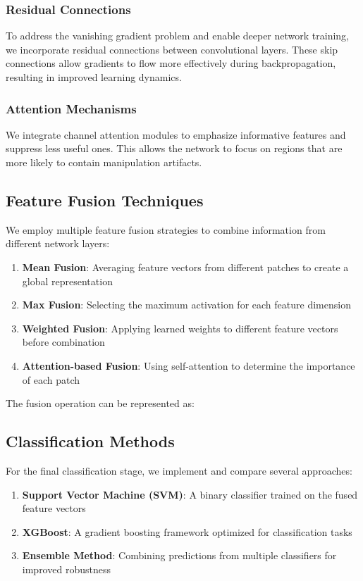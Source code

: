 \documentclass[conference]{IEEEtran}
\begin{document}
\subsubsection{Residual Connections}
To address the vanishing gradient problem and enable deeper network training, we incorporate residual connections between convolutional layers. These skip connections allow gradients to flow more effectively during backpropagation, resulting in improved learning dynamics.


\subsubsection{Attention Mechanisms}
We integrate channel attention modules to emphasize informative features and suppress less useful ones. This allows the network to focus on regions that are more likely to contain manipulation artifacts.



\subsection{Feature Fusion Techniques}
We employ multiple feature fusion strategies to combine information from different network layers:

\begin{enumerate}
    \item \textbf{Mean Fusion}: Averaging feature vectors from different patches to create a global representation
    \item \textbf{Max Fusion}: Selecting the maximum activation for each feature dimension
    \item \textbf{Weighted Fusion}: Applying learned weights to different feature vectors before combination
    \item \textbf{Attention-based Fusion}: Using self-attention to determine the importance of each patch
\end{enumerate}

The fusion operation can be represented as:



\subsection{Classification Methods}
For the final classification stage, we implement and compare several approaches:

\begin{enumerate}
    \item \textbf{Support Vector Machine (SVM)}: A binary classifier trained on the fused feature vectors
    \item \textbf{XGBoost}: A gradient boosting framework optimized for classification tasks
    \item \textbf{Ensemble Method}: Combining predictions from multiple classifiers for improved robustness
\end{enumerate}
\end{document}
